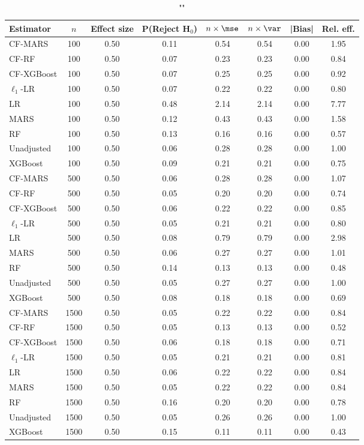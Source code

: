 \begin{table}
\centering
\caption{""}
\begin{tabular}{lccccccc}
\toprule
Estimator & $n$ & Effect size & P(Reject H$_0$) & $n\times\mse$ & $n\times \var$ & |Bias| & Rel. eff.\\ \midrule
CF-MARS & 100 & 0.50 & 0.11 & 0.54 & 0.54 & 0.00 & 1.95 \\ 
CF-RF & 100 & 0.50 & 0.07 & 0.23 & 0.23 & 0.00 & 0.84 \\ 
CF-XGBoost & 100 & 0.50 & 0.07 & 0.25 & 0.25 & 0.00 & 0.92 \\ 
$\ell_1$-LR & 100 & 0.50 & 0.07 & 0.22 & 0.22 & 0.00 & 0.80 \\ 
LR & 100 & 0.50 & 0.48 & 2.14 & 2.14 & 0.00 & 7.77 \\ 
MARS & 100 & 0.50 & 0.12 & 0.43 & 0.43 & 0.00 & 1.58 \\ 
RF & 100 & 0.50 & 0.13 & 0.16 & 0.16 & 0.00 & 0.57 \\ 
Unadjusted & 100 & 0.50 & 0.06 & 0.28 & 0.28 & 0.00 & 1.00 \\ 
XGBoost & 100 & 0.50 & 0.09 & 0.21 & 0.21 & 0.00 & 0.75 \\ \addlinespace 
CF-MARS & 500 & 0.50 & 0.06 & 0.28 & 0.28 & 0.00 & 1.07 \\ 
CF-RF & 500 & 0.50 & 0.05 & 0.20 & 0.20 & 0.00 & 0.74 \\ 
CF-XGBoost & 500 & 0.50 & 0.06 & 0.22 & 0.22 & 0.00 & 0.85 \\ 
$\ell_1$-LR & 500 & 0.50 & 0.05 & 0.21 & 0.21 & 0.00 & 0.80 \\ 
LR & 500 & 0.50 & 0.08 & 0.79 & 0.79 & 0.00 & 2.98 \\ 
MARS & 500 & 0.50 & 0.06 & 0.27 & 0.27 & 0.00 & 1.01 \\ 
RF & 500 & 0.50 & 0.14 & 0.13 & 0.13 & 0.00 & 0.48 \\ 
Unadjusted & 500 & 0.50 & 0.05 & 0.27 & 0.27 & 0.00 & 1.00 \\ 
XGBoost & 500 & 0.50 & 0.08 & 0.18 & 0.18 & 0.00 & 0.69 \\ \addlinespace 
CF-MARS & 1500 & 0.50 & 0.05 & 0.22 & 0.22 & 0.00 & 0.84 \\ 
CF-RF & 1500 & 0.50 & 0.05 & 0.13 & 0.13 & 0.00 & 0.52 \\ 
CF-XGBoost & 1500 & 0.50 & 0.06 & 0.18 & 0.18 & 0.00 & 0.71 \\ 
$\ell_1$-LR & 1500 & 0.50 & 0.05 & 0.21 & 0.21 & 0.00 & 0.81 \\ 
LR & 1500 & 0.50 & 0.06 & 0.22 & 0.22 & 0.00 & 0.84 \\ 
MARS & 1500 & 0.50 & 0.05 & 0.22 & 0.22 & 0.00 & 0.84 \\ 
RF & 1500 & 0.50 & 0.16 & 0.20 & 0.20 & 0.00 & 0.78 \\ 
Unadjusted & 1500 & 0.50 & 0.05 & 0.26 & 0.26 & 0.00 & 1.00 \\ 
XGBoost & 1500 & 0.50 & 0.15 & 0.11 & 0.11 & 0.00 & 0.43 \\
\bottomrule
\end{tabular}
\end{table}

